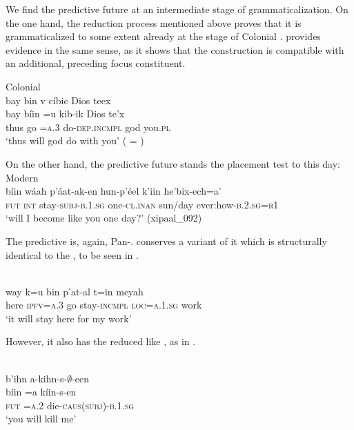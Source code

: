 \documentclass[output=paper]{langsci/langscibook}
\begin{document}
We find the predictive future at an intermediate stage of grammaticalization. On the one hand, the reduction process mentioned above proves that it is grammaticalized to some extent already at the stage of Colonial  .  provides evidence in the same sense, as it shows that the construction is compatible with an additional, preceding focus constituent.

\ea\label{ex:lehmann:67}
Colonial  \\
      bay  bin  v      cíbic        Dios  teex\\
\gll   bay  bíin  =u    kib-ik        Dios  te’x\\
thus  go    =\textsc{a.3}    do-\textsc{dep.incmpl}  god    you.\textsc{pl}\\
\glt ‘thus will god do with you’ (\citealt[72]{Coronel1620} = \citealt[24r]{SanBuenaventura1684})
\z

On the other hand, the predictive future  stands the  placement test to this day:
\ea\label{ex:lehmann:68}
Modern  \\
\gll       bíin  wáah  p'áat-ak-en      hun-p'éel      k'iin      he'bix-ech=a'\\
  \textsc{fut }  \textsc{int}    stay-\textsc{subj-b.1.sg}  one-\textsc{cl.inan}    sun/day  ever:how-\textsc{b.2.sg=r1}\\
\glt ‘will I become like you one day?’ (xipaal\_092)
\z

The predictive  is, again, Pan-.  conserves a variant of it which is structurally identical to the , to be seen in .

\ea\label{ex:lehmann:69}
\\
\gll       way  k=u                 bin    p’at-al                t=in        meyah\\
            here  \textsc{ipfv=a.3}  go    stay-\textsc{incmpl} \textsc{loc=a.1.sg}  work\\
\glt ‘it will stay here for my work’ \citep[42]{Bruce1974}
\z

However, it also has the reduced  like , as in .

\ea\label{ex:lehmann:70}
 \\
      b’ihn   a-kihn-s-${\emptyset}$-een\\
\gll   bíin    =a    kíin-s-en\\
  \textsc{fut  }   \textsc{=a.2}    die-\textsc{caus(subj)-b.1.sg}\\
\glt ‘you will kill me’ \citep[247]{Bergqvist2011}
\z
\end{document}
